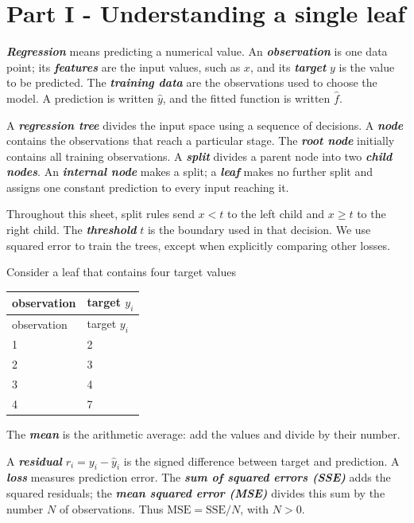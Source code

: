 \documentclass[10pt]{article}
\begin{document}
\clearpage
\section*{Part I - Understanding a single leaf}
\textbf{\textit{Regression}} means predicting a numerical value. An \textbf{\textit{observation}} is one data point; its \textbf{\textit{features}} are the input values, such as $x$, and its \textbf{\textit{target}} $y$ is the value to be predicted. The \textbf{\textit{training data}} are the observations used to choose the model. A prediction is written $\hat y$, and the fitted function is written $\hat f$.

A \textbf{\textit{regression tree}} divides the input space using a sequence of decisions. A \textbf{\textit{node}} contains the observations that reach a particular stage. The \textbf{\textit{root node}} initially contains all training observations. A \textbf{\textit{split}} divides a parent node into two \textbf{\textit{child nodes}}. An \textbf{\textit{internal node}} makes a split; a \textbf{\textit{leaf}} makes no further split and assigns one constant prediction to every input reaching it.

Throughout this sheet, split rules send $x<t$ to the left child and $x\geq t$ to the right child. The \textbf{\textit{threshold}} $t$ is the boundary used in that decision. We use squared error to train the trees, except when explicitly comparing other losses.

Consider a leaf that contains four target values

\begingroup
\small
\setlength{\tabcolsep}{4pt}
\begin{longtable}{l|l}
observation & target $y_i$ \\
\hline
\endfirsthead
observation & target $y_i$ \\
\hline
\endhead
1 & 2 \\[1.5pt]
2 & 3 \\[1.5pt]
3 & 4 \\[1.5pt]
4 & 7 \\[1.5pt]
\end{longtable}
\endgroup
The \textbf{\textit{mean}} is the arithmetic average: add the values and divide by their number.

A \textbf{\textit{residual}} $r_i=y_i-\hat y_i$ is the signed difference between target and prediction. A \textbf{\textit{loss}} measures prediction error. The \textbf{\textit{sum of squared errors (SSE)}} adds the squared residuals; the \textbf{\textit{mean squared error (MSE)}} divides this sum by the number $N$ of observations. Thus $\mathrm{MSE}=\mathrm{SSE}/N$, with $N>0$.
\end{document}
